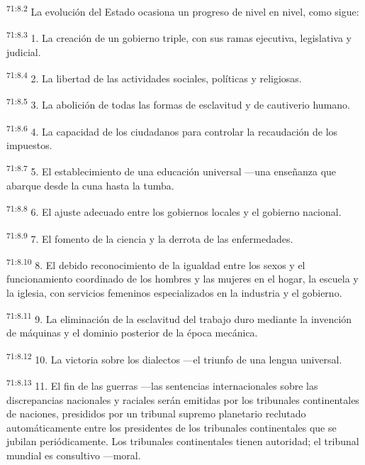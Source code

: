 \par
\textsuperscript{71:8.2} La evolución del Estado ocasiona un progreso de nivel en nivel, como sigue:

\par
\textsuperscript{71:8.3} 1. La creación de un gobierno triple, con sus ramas ejecutiva, legislativa y judicial.

\par
\textsuperscript{71:8.4} 2. La libertad de las actividades sociales, políticas y religiosas.

\par
\textsuperscript{71:8.5} 3. La abolición de todas las formas de esclavitud y de cautiverio humano.

\par
\textsuperscript{71:8.6} 4. La capacidad de los ciudadanos para controlar la recaudación de los impuestos.

\par
\textsuperscript{71:8.7} 5. El establecimiento de una educación universal ---una enseñanza que abarque desde la cuna hasta la tumba.

\par
\textsuperscript{71:8.8} 6. El ajuste adecuado entre los gobiernos locales y el gobierno nacional.

\par
\textsuperscript{71:8.9} 7. El fomento de la ciencia y la derrota de las enfermedades.

\par
\textsuperscript{71:8.10} 8. El debido reconocimiento de la igualdad entre los sexos y el funcionamiento coordinado de los hombres y las mujeres en el hogar, la escuela y la iglesia, con servicios femeninos especializados en la industria y el gobierno.

\par
\textsuperscript{71:8.11} 9. La eliminación de la esclavitud del trabajo duro mediante la invención de máquinas y el dominio posterior de la época mecánica.

\par
\textsuperscript{71:8.12} 10. La victoria sobre los dialectos ---el triunfo de una lengua universal.

\par
\textsuperscript{71:8.13} 11. El fin de las guerras ---las sentencias internacionales sobre las discrepancias nacionales y raciales serán emitidas por los tribunales continentales de naciones, presididos por un tribunal supremo planetario reclutado automáticamente entre los presidentes de los tribunales continentales que se jubilan periódicamente. Los tribunales continentales tienen autoridad; el tribunal mundial es consultivo ---moral.

